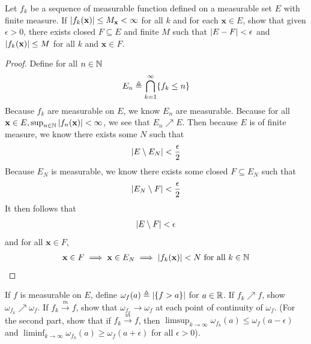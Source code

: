 \documentclass{report}
\begin{document}
\begin{question}{}{}
Let $f_k$ be a sequence of measurable function defined on a measurable set  $E$ with finite measure. If  $\left|f_k(\textbf{x})\right|\leq M_{\textbf{x}}<\infty$ for all $k$ and for each  $\textbf{x} \in E$, show that given $\epsilon >0$, there exists closed $F\subseteq E$ and finite $M$ such that  $\left|E-F\right|< \epsilon $ and $\left|f_k(\textbf{x})\right|\leq M$ for all $k$ and  $\textbf{x}\in F$. 
\end{question}
\begin{proof}
Define for all $n\in\mathbb{N}$
\begin{align*}
E_n \triangleq \bigcap_{k=1}^{\infty} \{  f_k \leq n \}
\end{align*}
Because $f_k$ are measurable on $E$, we know $E_n$ are measurable. Because for all $\textbf{x} \in E, \sup_{n\in\mathbb{N}}\left|f_n(\textbf{x})\right|< \infty$, we see that $E_n \nearrow E$. Then because $E$ is of finite measure, we know there exists some  $N$ such that 
\begin{align*}
\left|E\setminus E_N\right|< \frac{\epsilon}{2}
\end{align*}
Because $E_N$ is measurable, we know there exists some closed $F\subseteq E_N$ such that 
\begin{align*}
\left|E_N\setminus F\right|< \frac{\epsilon}{2}
\end{align*}
It then follows that 
\begin{align*}
\left|E\setminus F\right|< \epsilon 
\end{align*}
and for all $\textbf{x} \in F$, 
\begin{align*}
\textbf{x} \in F \implies  \textbf{x}\in E_N\implies \left|f_k(\textbf{x})\right|<N\text{ for all }k\in\mathbb{N}
\end{align*}
\end{proof}
\begin{question}{}{}
If $f$ is measurable on $E$, define  $\omega_f(a)\triangleq \left|\{ f>a \}\right|$ for $a \in\mathbb{R}$. If $f_k\nearrow f$, show  $\omega_{f_k}\nearrow \omega_f$.  If $f_k \overset{m}{\to}f$, show that $\omega_{f_k}\to \omega_f$ at each point of continuity of $\omega_f$. (For the second part, show that if $f_k\overset{m}{\to}f$, then $\limsup_{k\to\infty}\omega_{f_k}(a)\leq \omega_f (a-\epsilon )$ and $\liminf_{k\to\infty} \omega_{f_k}(a)\geq \omega_f(a+\epsilon ) $ for all $\epsilon >0$). 
\end{question}
\end{document}
